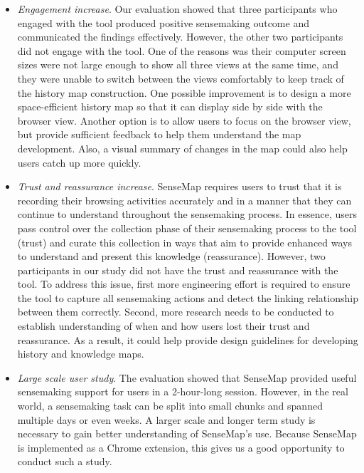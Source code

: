 \begin{itemize}
	\item \emph{Engagement increase}. Our evaluation showed that three participants who engaged with the tool produced positive sensemaking outcome and communicated the findings effectively. However, the other two participants did not engage with the tool. One of the reasons was their computer screen sizes were not large enough to show all three views at the same time, and they were unable to switch between the views comfortably to keep track of the history map construction. One possible improvement is to design a more space-efficient history map so that it can display side by side with the browser view. Another option is to allow users to focus on the browser view, but provide sufficient feedback to help them understand the map development. Also, a visual summary of changes in the map could also help users catch up more quickly.
	
	\item \emph{Trust and reassurance increase}. SenseMap requires users to trust that it is recording their browsing activities accurately and in a manner that they can continue to understand throughout the sensemaking process. In essence, users pass control over the collection phase of their sensemaking process to the tool (trust) and curate this collection in ways that aim to provide enhanced ways to understand and present this knowledge (reassurance). However, two participants in our study did not have the trust and reassurance with the tool. To address this issue, first more engineering effort is required to ensure the tool to capture all sensemaking actions and detect the linking relationship between them correctly. Second, more research needs to be conducted to establish understanding of when and how users lost their trust and reassurance. As a result, it could help provide design guidelines for developing history and knowledge maps.

	\item \emph{Large scale user study}. The evaluation showed that SenseMap provided useful sensemaking support for users in a 2-hour-long session. However, in the real world, a sensemaking task can be split into small chunks and spanned multiple days or even weeks. A larger scale and longer term study is necessary to gain better understanding of SenseMap's use. Because SenseMap is implemented as a Chrome extension, this gives us a good opportunity to conduct such a study.
\end{itemize}

